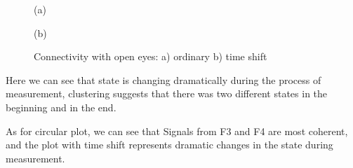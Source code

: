 \begin{figure}[h!]
\begin{minipage}[h]{0.49\linewidth}
 (a) \\
\end{minipage}
\hfill
\begin{minipage}[h]{0.5\linewidth}
 (b) \\
\end{minipage}
\caption{Connectivity with open eyes: a) ordinary b) time shift} 
\end{figure}
\par Here we can see that state is changing dramatically during the process of measurement, clustering suggests that there was two different states in the beginning and in the end.
\par As for circular plot, we can see that Signals from F3 and F4 are most coherent, and the plot with time shift represents dramatic changes in the state during measurement.


